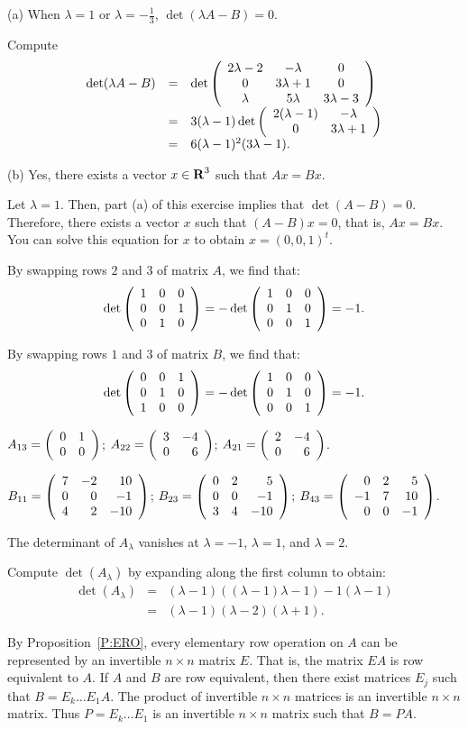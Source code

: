 (a) \ans When $\lambda = 1$ or $\lambda = -\frac{1}{3}$,
$\det(\lambda A - B) = 0$.

\soln Compute
\[
\begin{array}{rcl}
\det(\lambda A - B) & = & \det\left(\begin{array}{ccc} 2\lambda - 2 & -\lambda & 0 \\ 0 & 3\lambda + 1 & 0 \\ \lambda & 5\lambda & 3\lambda - 3\end{array}\right) \\
& = & 3(\lambda - 1)\det\left(\begin{array}{cc} 2(\lambda - 1) & -\lambda\\ 0 &3\lambda + 1\end{array}\right) \\
& = & 6(\lambda - 1)^2(3\lambda - 1).
\end{array}
\]

(b) \ans Yes, there exists a vector $x \in \mbox{$\bf{R}$}^3$ such that $Ax = Bx$.

\soln Let $\lambda = 1$.  Then, part (a) of this exercise implies that
$\det(A - B) = 0$.  Therefore, there exists a vector $x$ such that
$(A - B)x = 0$, that is, $Ax = Bx$.  You can solve this equation for $x$
to obtain $x = (0,0,1)^t$.

By swapping rows $2$ and $3$ of matrix $A$, we find that:
\[
\det\left(\begin{array}{rrr} 1 & 0 & 0 \\ 0 & 0 & 1 \\ 0 & 1 & 0\end{array}\right) =
-\det\left(\begin{array}{rrr} 1 & 0 & 0 \\ 0 & 1 & 0 \\ 0 & 0 & 1\end{array}\right) = -1. \\
\]

By swapping rows $1$ and $3$ of matrix $B$, we find that:
\[
\det\left(\begin{array}{rrr} 0 & 0 & 1 \\ 0 & 1 & 0 \\ 1 & 0 & 0\end{array}\right) =
-\det\left(\begin{array}{rrr} 1 & 0 & 0 \\ 0 & 1 & 0 \\ 0 & 0 & 1\end{array}\right) = -1.
\]

\newpage
{}
$A_{13} = \left(\begin{array}{rr} 0 & 1\\ 0 &0\end{array}\right)$;
$A_{22} = \left(\begin{array}{rr} 3 & -4\\ 0 &6\end{array}\right)$;
$A_{21} = \left(\begin{array}{rr} 2 & -4\\ 0 &6\end{array}\right)$.

$B_{11} = \left(\begin{array}{rrr} 7 & -2 & 10 \\ 0 & 0 & -1 \\ 4 & 2 & -10\end{array}\right)$;
$B_{23} = \left(\begin{array}{rrr} 0 & 2 & 5 \\ 0 & 0 & -1 \\ 3 & 4 & -10\end{array}\right)$;
$B_{43} = \left(\begin{array}{rrr} 0 & 2 & 5 \\ -1 & 7 & 10 \\ 0 & 0 & -1\end{array}\right)$.

\ans The determinant of $A_\lambda$ vanishes at $\lambda = -1$,
$\lambda = 1$, and $\lambda = 2$.

\soln Compute $\det(A_\lambda)$ by expanding along the first column
to obtain:
\[
\begin{array}{rcl}
\det(A_\lambda) & = &
(\lambda - 1)((\lambda - 1)\lambda - 1) - 1(\lambda - 1) \\
& = & (\lambda - 1)(\lambda - 2)(\lambda + 1).
\end{array}
\]

By Proposition~\ref{P:ERO}, every
elementary row operation on $A$ can be represented by an invertible $n
\times n$ matrix $E$.  That is, the matrix $EA$ is row equivalent to
$A$.  If $A$ and $B$ are row equivalent, then there exist matrices
$E_j$ such that $B = E_k\ldots E_1A$.  The product of invertible $n
\times n$ matrices is an invertible $n \times n$ matrix.  Thus $P =
E_k\ldots E_1$ is an invertible $n \times n$ matrix such that $B =
PA$.

